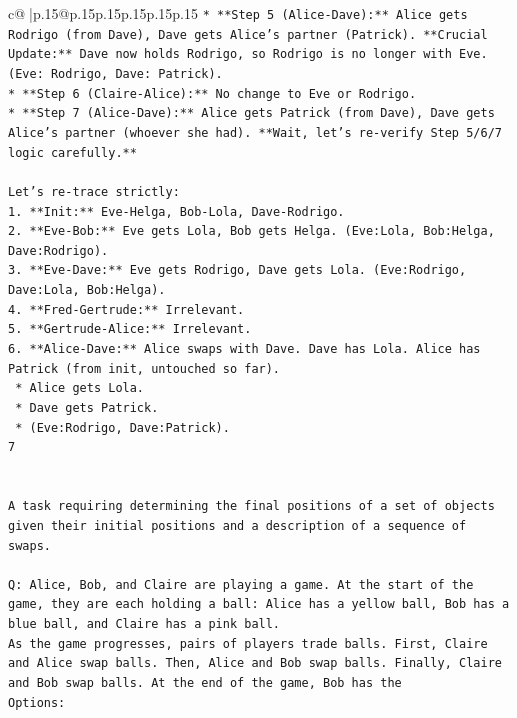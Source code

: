 \documentclass{article}
\begin{document}
{\begin{supertabular}{c@{$\;$}|p{.15\linewidth}@{}p{.15\linewidth}p{.15\linewidth}p{.15\linewidth}p{.15\linewidth}p{.15\linewidth}}
{{{\texttt{*   **Step 5 (Alice{-}Dave):** Alice gets Rodrigo (from Dave), Dave gets Alice's partner (Patrick). **Crucial Update:** Dave now holds Rodrigo, so Rodrigo is no longer with Eve. (Eve: Rodrigo, Dave: Patrick).} \\
\texttt{*   **Step 6 (Claire{-}Alice):** No change to Eve or Rodrigo.} \\
\texttt{*   **Step 7 (Alice{-}Dave):** Alice gets Patrick (from Dave), Dave gets Alice's partner (whoever she had). **Wait, let's re{-}verify Step 5/6/7 logic carefully.**} \\
\\ 
\texttt{Let's re{-}trace strictly:} \\
\texttt{1.  **Init:** Eve{-}Helga, Bob{-}Lola, Dave{-}Rodrigo.} \\
\texttt{2.  **Eve{-}Bob:** Eve gets Lola, Bob gets Helga. (Eve:Lola, Bob:Helga, Dave:Rodrigo).} \\
\texttt{3.  **Eve{-}Dave:** Eve gets Rodrigo, Dave gets Lola. (Eve:Rodrigo, Dave:Lola, Bob:Helga).} \\
\texttt{4.  **Fred{-}Gertrude:** Irrelevant.} \\
\texttt{5.  **Gertrude{-}Alice:** Irrelevant.} \\
\texttt{6.  **Alice{-}Dave:** Alice swaps with Dave. Dave has Lola. Alice has Patrick (from init, untouched so far).} \\
\texttt{    *   Alice gets Lola.} \\
\texttt{    *   Dave gets Patrick.} \\
\texttt{    *   (Eve:Rodrigo, Dave:Patrick).} \\
\texttt{7} \\
\\ 
\\ 
\texttt{A task requiring determining the final positions of a set of objects given their initial positions and a description of a sequence of swaps.} \\
\\ 
\texttt{Q: Alice, Bob, and Claire are playing a game. At the start of the game, they are each holding a ball: Alice has a yellow ball, Bob has a blue ball, and Claire has a pink ball.} \\
\texttt{As the game progresses, pairs of players trade balls. First, Claire and Alice swap balls. Then, Alice and Bob swap balls. Finally, Claire and Bob swap balls. At the end of the game, Bob has the} \\
\texttt{Options:} \\
}}}
\end{supertabular}}
\end{document}
